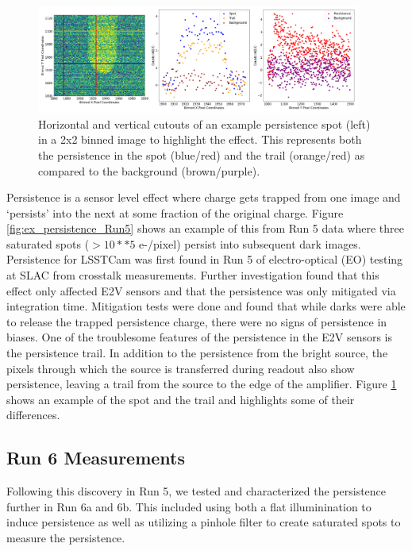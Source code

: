 \documentclass[DM,authoryear,toc]{lsstdoc}
\begin{document}
\begin{figure}[!htp]
  \centering
  \includegraphics[width=0.95\textwidth, angle=0]{Persistence_Cuts.png}
  \caption{
  Horizontal and vertical cutouts of an example persistence spot (left) in a 2x2 binned image to highlight the effect. 
  This represents both the persistence in the spot (blue/red) and the trail (orange/red) as compared to the background (brown/purple).
  }\label{fig:cuts}
\end{figure}

Persistence is a sensor level effect where charge gets trapped from one image and `persists' into the next at some fraction of the original charge. 
Figure \ref{fig:ex_persistence_Run5} shows an example of this from Run 5 data where three saturated spots ($>10**5$ e-/pixel) persist into subsequent dark images. 
Persistence for LSSTCam was first found in Run 5 of electro-optical (EO) testing at SLAC from crosstalk measurements. 
Further investigation found that this effect only affected E2V sensors
and that the persistence was only mitigated via integration time. 
Mitigation tests were done and found that while darks were able to release the trapped persistence charge, there were no signs of persistence in biases. 
One of the troublesome features of the persistence in the E2V sensors is the persistence trail. 
In addition to the persistence from the bright source, the pixels through which the source is transferred during readout also show persistence, leaving a trail from the source to the edge of the amplifier.
Figure \ref{fig:cuts} shows an example of the spot and the trail and highlights some of their differences.

\subsection{Run 6 Measurements}
Following this discovery in Run 5, we tested and characterized the persistence further in Run 6a and 6b. 
This included using both a flat illuminination to induce persistence as well as utilizing a pinhole filter to create saturated spots to measure the persistence.
\end{document}

